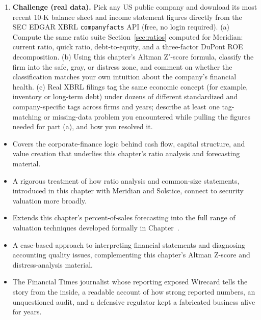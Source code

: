 \documentclass[../ai_in_finance]{subfiles}
\begin{document}
\begin{enumerate}[exercises]
    \item \textbf{Challenge (real data).} Pick any US public company and download its most recent 10-K balance sheet and income statement figures directly from the SEC EDGAR XBRL \texttt{companyfacts} API (free, no login required). (a) Compute the same ratio suite Section~\ref{sec:ratios} computed for Meridian: current ratio, quick ratio, debt-to-equity, and a three-factor DuPont ROE decomposition. (b) Using this chapter's Altman Z$'$-score formula, classify the firm into the safe, gray, or distress zone, and comment on whether the classification matches your own intuition about the company's financial health. (c) Real XBRL filings tag the same economic concept (for example, inventory or long-term debt) under dozens of different standardized and company-specific tags across firms and years; describe at least one tag-matching or missing-data problem you encountered while pulling the figures needed for part (a), and how you resolved it.
\end{enumerate}


\begin{itemize}
    \item {} Covers the corporate-finance logic behind cash flow, capital structure, and value creation that underlies this chapter's ratio analysis and forecasting material.
    \item {} A rigorous treatment of how ratio analysis and common-size statements, introduced in this chapter with Meridian and Solstice, connect to security valuation more broadly.
    \item {} Extends this chapter's percent-of-sales forecasting into the full range of valuation techniques developed formally in Chapter~.
    \item {} A case-based approach to interpreting financial statements and diagnosing accounting quality issues, complementing this chapter's Altman Z-score and distress-analysis material.
    \item {} The Financial Times journalist whose reporting exposed Wirecard tells the story from the inside, a readable account of how strong reported numbers, an unquestioned audit, and a defensive regulator kept a fabricated business alive for years.
\end{itemize}
\end{document}
